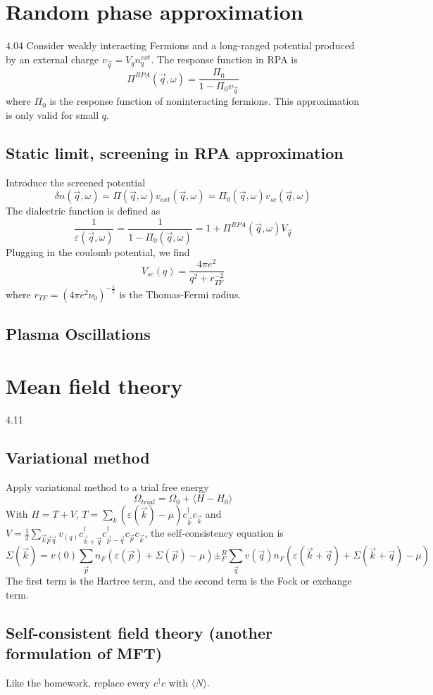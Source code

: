 \documentclass[10pt]{article}
\begin{document}
\section{Random phase approximation}
4.04
Consider weakly interacting Fermions and a long-ranged potential produced by an external charge $v_{\vec q} = V_q n_q^{ext}$. The response function in RPA is
$$
\Pi^{RPA}(\vec q, \omega) = \frac{\Pi_0}{1-\Pi_0v_{\vec q}}
$$
where $\Pi_0$ is the response function of noninteracting fermions. This approximation is only valid for small $q$. \\
\subsection{Static limit, screening in RPA approximation}
Introduce the screened potential
$$
\delta n(\vec q, \omega) = \Pi(\vec q, \omega)v_{ext}(\vec q, \omega) = \Pi_0(\vec q, \omega)v_{sc}(\vec q, \omega)
$$
The dialectric function is defined as
$$
\frac{1}{\varepsilon(\vec q, \omega)}  = \frac{1}{1-\Pi_0(\vec q, \omega)} = 1+\Pi^{RPA}(\vec q, \omega)V_{\vec q}
$$
Plugging in the coulomb potential, we find
$$
V_{sc}(q) = \frac{4\pi e^2}{q^2+r_{TF}^{-2}}
$$
where $r_{TF} = (4\pi e^2 \nu_0)^{-\frac{1}{2}}$ is the Thomas-Fermi radius. 
\subsection{Plasma Oscillations}
\section{Mean field theory}
4.11
\subsection{Variational method}
Apply variational method to a trial free energy
$$
\Omega_{trial} = \Omega_0 + \langle H-H_0\rangle
$$
With $H = T +V$, $T = \sum_k(\varepsilon(\vec k)-\mu)c_{\vec k}^\dagger c_{\vec k}$ and $V = \frac{1}{2}\sum_{\vec k \vec p \vec q} v_(q) c_{\vec k + \vec q}^\dagger c_{\vec p - \vec q}^\dagger c_{\vec p}c_{\vec k}$, the self-consistency equation is 
$$
\Sigma(\vec k) = v(0) \sum_{\vec p}n_F(\varepsilon(\vec p) + \Sigma(\vec p)-\mu) \pm^B_F \sum_{\vec q}v(\vec q) n_F(\varepsilon(\vec k + \vec q)+ \Sigma(\vec k + \vec q)-\mu)
$$
The first term is the Hartree term, and the second term is the Fock or exchange term.
\subsection{Self-consistent field theory (another formulation of MFT)}
Like the homework, replace every $c^\dagger c$ with $\langle N \rangle$.
\end{document}
